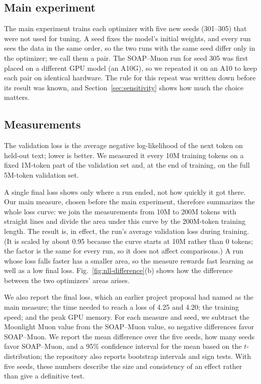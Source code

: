 


\subsection{Main experiment}

The main experiment trains each optimizer with five new seeds (301--305) that
were not used for tuning. A seed fixes the model's initial weights, and every
run sees the data in the same order, so the two runs with the same seed differ
only in the optimizer; we call them a pair. The SOAP--Muon run for seed 305 was
first placed on a different GPU model (an A10G), so we repeated it on an A10 to
keep each pair on identical hardware. The rule for this repeat was written down
before its result was known, and Section~\ref{sec:sensitivity} shows how much
the choice matters.

\subsection{Measurements}
\label{sec:measurements}

The validation loss is the average negative log-likelihood of the next token on
held-out text; lower is better. We measured it every 10M training tokens on a
fixed 1M-token part of the validation set and, at the end of training, on the
full 5M-token validation set.

A single final loss shows only where a run ended, not how quickly it got there.
Our main measure, chosen before the main experiment, therefore summarizes the
whole loss curve: we join the measurements from 10M to 200M tokens with
straight lines and divide the area under this curve by the 200M-token training
length. The result is, in effect, the run's average validation loss during
training. (It is scaled by about 0.95 because the curve starts at 10M rather
than 0 tokens; the factor is the same for every run, so it does not affect
comparisons.) A run whose loss falls faster has a smaller area, so the measure
rewards fast learning as well as a low final loss.
Fig.~\ref{fig:nll-difference}(b) shows how the difference between the two
optimizers' areas arises.

We also report the final loss, which an earlier project proposal had named as
the main measure; the time needed to reach a loss of 4.25 and 4.20; the
training speed; and the peak GPU memory. For each measure and seed, we subtract
the Moonlight Muon value from the SOAP--Muon value, so negative differences
favor SOAP--Muon. We report the mean difference over the five seeds, how many
seeds favor SOAP--Muon, and a 95\% confidence interval for the mean based on
the $t$-distribution; the repository also reports bootstrap intervals and sign
tests. With five seeds, these numbers describe the size and consistency of an
effect rather than give a definitive test.
